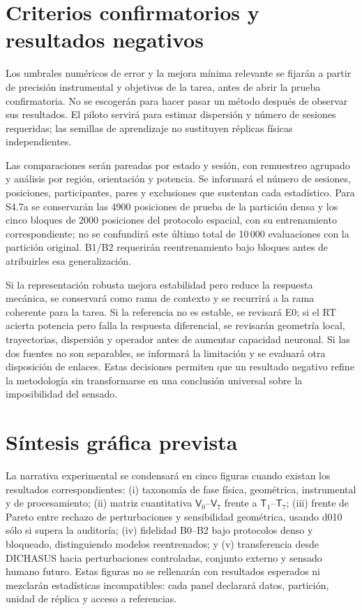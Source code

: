 \section{Criterios confirmatorios y resultados negativos}

Los umbrales numéricos de error y la mejora mínima relevante se fijarán a partir de
precisión instrumental y objetivos de la tarea, antes de abrir la prueba confirmatoria.
No se escogerán para hacer pasar un método después de observar sus resultados. El
piloto servirá para estimar dispersión y número de sesiones requeridas; las semillas
de aprendizaje no sustituyen réplicas físicas independientes.

Las comparaciones serán pareadas por estado y sesión, con remuestreo agrupado y
análisis por región, orientación y potencia. Se informará el número de sesiones,
posiciones, participantes, pares y exclusiones que sustentan cada estadístico. Para
S4.7a se conservarán las 4900 posiciones de prueba de la partición densa y los cinco
bloques de 2000 posiciones del protocolo espacial, con su entrenamiento correspondiente;
no se confundirá este último total de 10\,000 evaluaciones con la partición original.
B1/B2 requerirán reentrenamiento bajo bloques antes de atribuirles esa generalización.

Si la representación robusta mejora estabilidad pero reduce la respuesta mecánica,
se conservará como rama de contexto y se recurrirá a la rama coherente para la tarea.
Si la referencia no es estable, se revisará E0; si el RT acierta potencia pero falla
la respuesta diferencial, se revisarán geometría local, trayectorias, dispersión y
operador antes de aumentar capacidad neuronal. Si las dos fuentes no son separables,
se informará la limitación y se evaluará otra disposición de enlaces. Estas decisiones
permiten que un resultado negativo refine la metodología sin transformarse en una
conclusión universal sobre la imposibilidad del sensado.

\section{Síntesis gráfica prevista}

La narrativa experimental se condensará en cinco figuras cuando existan los resultados
correspondientes: (i) taxonomía de fase física, geométrica, instrumental y de
procesamiento; (ii) matriz cuantitativa $\mathsf V_0$--$\mathsf V_7$ frente a
$\mathsf T_1$--$\mathsf T_7$; (iii) frente de Pareto entre rechazo de perturbaciones
y sensibilidad geométrica, usando d010 sólo si supera la auditoría; (iv) fidelidad
B0--B2 bajo protocolos denso y bloqueado, distinguiendo modelos reentrenados; y
(v) transferencia desde DICHASUS hacia perturbaciones controladas, conjunto externo
y sensado humano futuro. Estas figuras no se rellenarán con resultados esperados ni
mezclarán estadísticas incompatibles: cada panel declarará datos, partición, unidad
de réplica y acceso a referencias.
